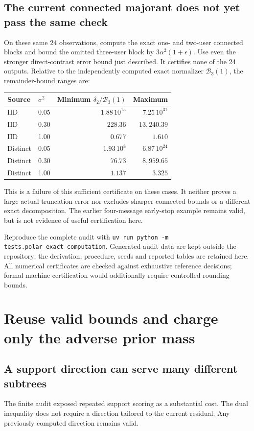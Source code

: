 \documentclass[10pt,a4paper]{article}
\begin{document}
\subsection{The current connected majorant does not yet pass the same check}
On these same 24 observations, compute the exact one- and two-user connected blocks and bound the omitted
three-user block by $3\alpha^2(1+\epsilon)$. Use even the stronger direct-contrast error bound just described.
It certifies none of the 24 outputs. Relative to the independently computed exact normalizer
$\mathcal B_3(1)$, the remainder-bound ranges are:
\begin{center}
\begin{tabular}{@{}llrr@{}}\toprule
Source & $\sigma^2$ & Minimum $\delta_2/\mathcal B_3(1)$ & Maximum\\\midrule
IID & 0.05 & $1.88\,10^{15}$ & $7.25\,10^{31}$\\
IID & 0.30 & $228.36$ & $13{,}240.39$\\
IID & 1.00 & $0.677$ & $1.610$\\
Distinct & 0.05 & $1.93\,10^8$ & $6.87\,10^{24}$\\
Distinct & 0.30 & $76.73$ & $8{,}959.65$\\
Distinct & 1.00 & $1.137$ & $3.325$\\\bottomrule
\end{tabular}
\end{center}
This is a failure of this sufficient certificate on these cases. It neither proves a large actual truncation
error nor excludes sharper connected bounds or a different exact decomposition.
The earlier four-message early-stop example remains valid, but is not evidence of useful certification here.

Reproduce the complete audit with \texttt{uv run python -m tests.polar\_exact\_computation}.
Generated audit data are kept outside the repository; the derivation, procedure, seeds and reported tables
are retained here. All numerical certificates are checked against exhaustive reference decisions; formal
machine certification would additionally require controlled-rounding bounds.

\clearpage
\section{Reuse valid bounds and charge only the adverse prior mass}
\label{sec:bound-reuse}
\subsection{A support direction can serve many different subtrees}
The finite audit exposed repeated support scoring as a substantial cost. The dual inequality does not require
a direction tailored to the current residual. Any previously computed direction remains valid.
\end{document}
